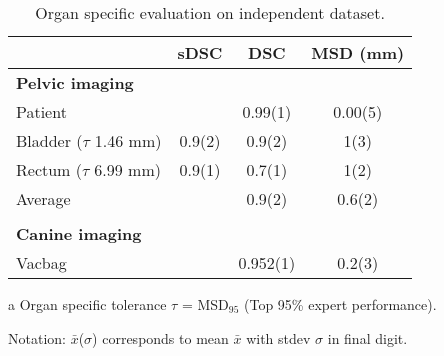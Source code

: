 \begin{table}[!htbp]
\footnotesize
\caption{Organ specific evaluation on independent dataset.}
\begin{threeparttable}[t]
  \centering
    \begin{tabular}{l c c c}
      & sDSC  & DSC         & MSD (mm)   \\
    \hline


    \textbf{Pelvic imaging}\tnote{a}     &              &              &       \\
    Patient                      &              & 0.99(1) & 0.00(5)  \\
    Bladder ($\tau$ 1.46 mm)     & 0.9(2)     & 0.9(2)     & 1(3)       \\
    Rectum ($\tau$ 6.99 mm)      & 0.9(1)     & 0.7(1)     & 1(2)       \\
    Average                      &              & 0.9(2)     & 0.6(2)   \\ \\
    \textbf{Canine imaging}      &              &              &           \\
    Vacbag                       &              & 0.952(1) & 0.2(3)    \\
    \hline
  \end{tabular}
  \begin{tablenotes}
    \scriptsize
  \item[a]Organ specific tolerance $\tau$ = MSD$_{95}$ (Top 95\% expert performance).
  \item[]Notation: $\bar{x}$($\sigma$) corresponds to mean $\bar{x}$ with stdev $\sigma$ in final digit.
  \end{tablenotes}
\end{threeparttable}%
\label{tab:addlabel}%
\end{table}%
